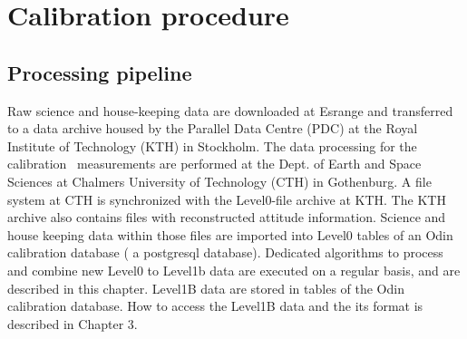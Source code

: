        
 
 
\chapter{Calibration procedure}
\label{chapter:calibration}




\section{Processing pipeline}

Raw science and house-keeping data are downloaded at
Esrange and transferred to a data archive housed by the Parallel
Data Centre (PDC) at the Royal Institute of Technology (KTH)
in Stockholm. The data processing for the calibration \smr\
measurements are performed at the Dept. of Earth and Space
Sciences at Chalmers University of Technology (CTH) in Gothenburg.
A file system at CTH is synchronized with the Level0-file archive 
at KTH. The KTH archive also contains files with reconstructed attitude
information.  Science and house keeping data within those files
are imported into Level0 tables of an Odin calibration database
( a postgresql database). 
Dedicated algorithms to process and combine new Level0 to Level1b
data are executed on a regular basis, and are described in this
chapter. Level1B data are stored in tables of the Odin calibration database.  
How to access the Level1B data and the its format is described
in Chapter 3.




